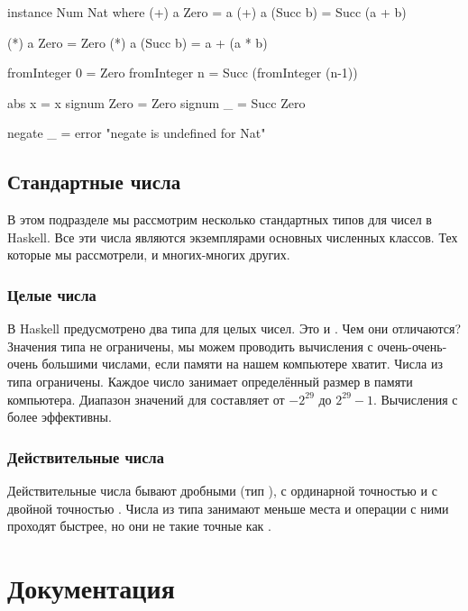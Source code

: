 \begin{code}
instance Num Nat where
    (+) a Zero     = a
    (+) a (Succ b) = Succ (a + b)

    (*) a Zero     = Zero
    (*) a (Succ b) = a + (a * b)   

    fromInteger 0 = Zero
    fromInteger n = Succ (fromInteger (n-1))

    abs    x    = x 
    signum Zero = Zero
    signum _    = Succ Zero

    negate _ = error "negate is undefined for Nat"
\end{code}


\subsection{Стандартные числа}

В этом подразделе мы рассмотрим несколько стандартных
типов для чисел в Haskell. Все эти числа являются
экземплярами основных численных классов. Тех которые
мы рассмотрели, и многих-многих других.

\subsubsection{Целые числа}

В Haskell предусмотрено два типа для целых чисел. 
Это   и . 
Чем они отличаются? 
Значения типа  не ограничены, мы можем проводить
вычисления с очень-очень-очень большими числами, если памяти на 
нашем компьютере хватит. Числа из типа   ограничены.
Каждое число занимает определённый размер в памяти компьютера. 
Диапазон значений для  составляет от $-2^{29}$ до $2^{29}-1$.
Вычисления с  более эффективны.  

\subsubsection{Действительные числа}

Действительные числа бывают дробными (тип ),
с ординарной точностью  и с двойной точностью 
. Числа из типа  занимают меньше места 
и операции с ними проходят быстрее, но они не такие точные
как .

\section{Документация}

